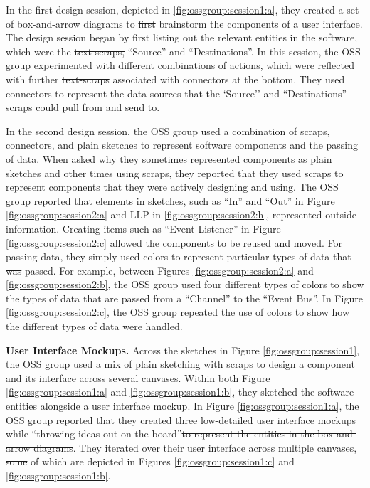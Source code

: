 \documentclass[12pt,fleqn]{ucithesis}
\providecommand{\DIFaddtex}[1]{{\protect\color{blue}\uwave{#1}}} %
\providecommand{\DIFdeltex}[1]{{\protect\color{red}\sout{#1}}}                      %
\providecommand{\DIFaddbegin}{} %
\providecommand{\DIFaddend}{} %
\providecommand{\DIFdelbegin}{} %
\providecommand{\DIFdelend}{} %
\providecommand{\DIFadd}[1]{\texorpdfstring{\DIFaddtex{#1}}{#1}} %
\providecommand{\DIFdel}[1]{\texorpdfstring{\DIFdeltex{#1}}{}} %
\begin{document}
In the first design session, depicted in \ref{fig:ossgroup:session1:a}, they created a set of box-and-arrow diagrams to \DIFdelbegin \DIFdel{first }\DIFdelend brainstorm the components of a user interface. The design session began by first listing out the relevant entities in the software, which were the \DIFdelbegin \DIFdel{text-scraps, }\DIFdelend \DIFaddbegin \DIFadd{text scraps }\DIFaddend ``Source'' and ``Destinations''. In this session, the OSS group experimented with different combinations of actions, which were reflected with further \DIFdelbegin \DIFdel{text-scraps }\DIFdelend \DIFaddbegin \DIFadd{text scraps }\DIFaddend associated with connectors at the bottom. They used connectors to represent the data sources that the `Source'' and ``Destinations'' scraps could pull from and send to.

In the second design session, the OSS group used a combination of scraps, connectors, and plain sketches to represent software components and the passing of data. When asked why they sometimes represented components as plain sketches and other times using scraps, they reported that they used scraps to represent components that they were actively designing and using. The OSS group reported that elements in sketches, such as ``In'' and ``Out'' in Figure \ref{fig:ossgroup:session2:a} and LLP in \ref{fig:ossgroup:session2:h}, represented outside information. Creating items such as ``Event Listener'' in Figure \ref{fig:ossgroup:session2:c} allowed the components to be reused and moved. For passing data, they simply used colors to represent particular types of data that \DIFdelbegin \DIFdel{was }\DIFdelend \DIFaddbegin \DIFadd{were }\DIFaddend passed. For example, between Figures \ref{fig:ossgroup:session2:a} and \ref{fig:ossgroup:session2:b}, the OSS group used four different types of colors to show the types of data that are passed from a ``Channel'' to the ``Event Bus''. In Figure \ref{fig:ossgroup:session2:c}, the OSS group repeated the use of colors to show how the different types of data were handled.

\textbf{User Interface Mockups. } Across the sketches in Figure \ref{fig:ossgroup:session1}, the OSS group used a mix of plain sketching with scraps to design a component and its interface across several canvases. \DIFdelbegin \DIFdel{Within }\DIFdelend \DIFaddbegin \DIFadd{In }\DIFaddend both Figure \ref{fig:ossgroup:session1:a} and \ref{fig:ossgroup:session1:b}, they sketched the software entities alongside a user interface mockup. In Figure \ref{fig:ossgroup:session1:a}, the OSS group reported that they created three low-detailed user interface mockups while ``throwing ideas out on the board''\DIFdelbegin \DIFdel{to represent the entities in the box-and-arrow diagrams}\DIFdelend . They iterated over their user interface across multiple canvases, \DIFdelbegin \DIFdel{some }\DIFdelend \DIFaddbegin \DIFadd{two }\DIFaddend of which are depicted in Figures \ref{fig:ossgroup:session1:c} and \ref{fig:ossgroup:session1:b}.
\end{document}
